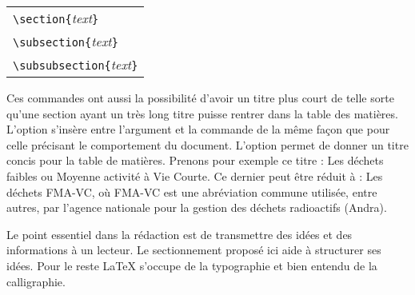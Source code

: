 %	
\begin{table}[H]
	\centering
	\begin{tabular}{l}
		\verb|\section{|\textit{text}\verb|}|\\
		\verb|\subsection{|\textit{text}\verb|}|\\
		\verb|\subsubsection{|\textit{text}\verb|}|
	\end{tabular}
\end{table}
%	
\par Ces commandes ont aussi la possibilité d'avoir un titre plus court de telle sorte qu'une section ayant un très long titre puisse rentrer dans la table des matières. L'option s'insère entre l'argument et la commande de la même façon que pour celle précisant le comportement du document. L'option permet de donner un titre concis pour la table de matières. Prenons pour exemple ce titre : Les déchets faibles ou Moyenne activité à Vie Courte. Ce dernier peut être réduit à : Les déchets  FMA-VC, où FMA-VC est une abréviation commune utilisée, entre autres, par l'agence nationale pour la gestion des déchets radioactifs (Andra).
%
\par Le point essentiel dans la rédaction est de transmettre des idées et des informations à un lecteur. Le sectionnement proposé ici aide à structurer ses idées. Pour le reste \LaTeX{} s'occupe de la typographie et bien entendu de la calligraphie.
